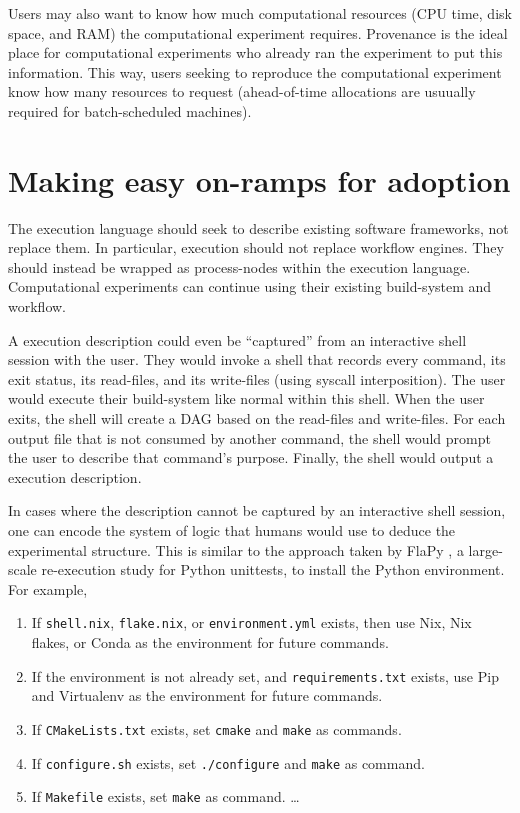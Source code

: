 \documentclass[manuscript,authordraft]{acmart}
\providecommand{\tightlist}{\setlength{\itemsep}{0pt}\setlength{\parskip}{0pt}}
\begin{document}
Users may also want to know how much computational resources (CPU time,
disk space, and RAM) the computational experiment requires. Provenance
is the ideal place for computational experiments who already ran the
experiment to put this information. This way, users seeking to reproduce
the computational experiment know how many resources to request
(ahead-of-time allocations are usuually required for batch-scheduled
machines).

\hypertarget{making-easy-on-ramps-for-adoption}{%
\section{Making easy on-ramps for
adoption}\label{making-easy-on-ramps-for-adoption}}

The execution language should seek to describe existing software
frameworks, not replace them. In particular, execution should not
replace workflow engines. They should instead be wrapped as
process-nodes within the execution language. Computational experiments
can continue using their existing build-system and workflow.

A execution description could even be ``captured'' from an interactive
shell session with the user. They would invoke a shell that records
every command, its exit status, its read-files, and its write-files
(using syscall interposition). The user would execute their build-system
like normal within this shell. When the user exits, the shell will
create a DAG based on the read-files and write-files. For each output
file that is not consumed by another command, the shell would prompt the
user to describe that command's purpose. Finally, the shell would output
a execution description.

In cases where the description cannot be captured by an interactive
shell session, one can encode the system of logic that humans would use
to deduce the experimental structure. This is similar to the approach
taken by FlaPy \cite{gruber_empirical_2021}, a large-scale re-execution
study for Python unittests, to install the Python environment. For
example,

\begin{enumerate}
\def\labelenumi{\arabic{enumi}.}
\tightlist
\item
  If \texttt{shell.nix}, \texttt{flake.nix}, or \texttt{environment.yml}
  exists, then use Nix, Nix flakes, or Conda as the environment for
  future commands.
\item
  If the environment is not already set, and \texttt{requirements.txt}
  exists, use Pip and Virtualenv as the environment for future commands.
\item
  If \texttt{CMakeLists.txt} exists, set \texttt{cmake} and
  \texttt{make} as commands.
\item
  If \texttt{configure.sh} exists, set \texttt{./configure} and
  \texttt{make} as command.
\item
  If \texttt{Makefile} exists, set \texttt{make} as command. \ldots{}
\end{enumerate}
\end{document}
